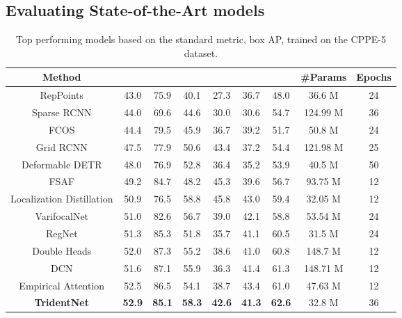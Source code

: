 \documentclass{article}
\begin{document}
\subsection{Evaluating State-of-the-Art models}
\label{Evaluating State-of-the-Art models}

\begin{table}
    \caption{Top performing models based on the standard metric, box AP, trained on the CPPE-5 dataset.}
    \centering
    \begin{tabularx}{\textwidth}{c|c|ccccc|c|c}
        \toprule
        Method &  &  &  &  &  &  & \#Params & Epochs \\
        \hline
        RepPoints \cite{yang2019reppoints} & 43.0 & 75.9 & 40.1 & 27.3 & 36.7 & 48.0 & 36.6 M & 24 \\
        Sparse RCNN \cite{sun2021sparse} & 44.0 & 69.6 & 44.6 & 30.0 & 30.6 & 54.7 & 124.99 M & 36 \\
        FCOS \cite{tian2019fcos} & 44.4 & 79.5 & 45.9 & 36.7 & 39.2 & 51.7 & 50.8 M & 24 \\
        Grid RCNN \cite{8953602, lu2019grid} & 47.5 & 77.9 & 50.6 & 43.4 & 37.2 & 54.4 & 121.98 M & 25 \\
        Deformable DETR \cite{zhu2020deformable} & 48.0 & 76.9 & 52.8 & 36.4 & 35.2 & 53.9 & 40.5 M & 50 \\
        FSAF \cite{zhu2019feature} & 49.2 & 84.7 & 48.2 & 45.3 & 39.6 & 56.7 & 93.75 M & 12 \\
        Localization Distillation \cite{zheng2021localization} & 50.9 & 76.5 & 58.8 & 45.8 & 43.0 & 59.4 & 32.05 M & 12 \\
        VarifocalNet \cite{Zhang_2021_CVPR} & 51.0 & 82.6 & 56.7 & 39.0 & 42.1 & 58.8 & 53.54 M & 24 \\
        RegNet \cite{radosavovic2020designing} & 51.3 & 85.3 & 51.8 & 35.7 & 41.1 & 60.5 & 31.5 M & 24 \\
        Double Heads \cite{wu2020rethinking} & 52.0 & 87.3 & 55.2 & 38.6 & 41.0 & 60.8 & 148.7 M & 12 \\
        DCN \cite{dai2017deformable, zhu2019deformable} & 51.6 & 87.1 & 55.9 & 36.3 & 41.4 & 61.3 & 148.71 M & 12 \\
        Empirical Attention \cite{Zhu_2019_ICCV} & 52.5 & 86.5 & 54.1 & 38.7 & 43.4 & 61.0 & 47.63 M & 12 \\
        \textbf{TridentNet} \cite{li2019scale} & \textbf{52.9} & \textbf{85.1} & \textbf{58.3} & \textbf{42.6} & \textbf{41.3} & \textbf{62.6} & 32.8 M & 36 \\
        \bottomrule
    \end{tabularx}
    \label{tab:results}
\end{table}
\end{document}
